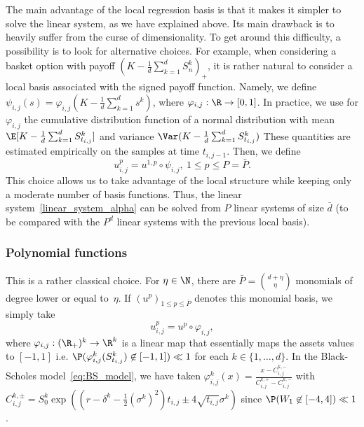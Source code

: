 The main advantage of the local regression basis is that it makes it simpler to solve the linear system, as we have explained above. Its main drawback is to heavily suffer from the curse of dimensionality. To get around this difficulty, a possibility is to look for alternative choices. For example, when considering a basket option with payoff $\left(K- \frac 1d \sum_{k=1}^d S^k_n \right)_+$,
it is rather natural to consider a local basis associated with the signed payoff function. Namely, we define $\psi_{i,j}(s)= \varphi_{i,j}\left( K- \frac 1d \sum_{k=1}^d s^k\right)$, where $\varphi_{i,j}: \R \to [0,1]$. In practice, we use for $\varphi_{i,j}$ the cumulative distribution function of a normal distribution with mean $\E[K- \frac 1d \sum_{k=1}^d S^k_{t_{i,j}}]$ and variance $\Var(K- \frac 1d \sum_{k=1}^d S^k_{t_{i,j}})$
These quantities are estimated empirically on the samples at time $t_{i,j-1}$. Then, we define
\begin{equation}\label{def_upij_localpayoff} u^p_{i,j}=u^{1,p} \circ \psi_{i,j}, \ 1 \le p \le P=\bar{P}.  
\end{equation}
This choice allows us to take advantage of the local structure while keeping only a moderate number of basis functions. Thus, the linear system~\eqref{linear_system_alpha} can be solved from $P$ linear systems of size $\bar{d}$ (to be compared with the $P^d$ linear systems with the previous local basis). 


\subsubsection*{Polynomial functions}

This is a rather classical choice. For $\eta \in \N$, there are $\bar{P}=\binom{d+\eta}{\eta}$ monomials of degree lower or equal to~${\eta}$. If $(u^p)_{1\le p\le \bar{P}}$ denotes this monomial basis, we simply take 
\begin{equation}\label{def_upij_polynomial}
  u^p_{i,j}=u^p\circ \varphi_{i,j},
\end{equation} where $\varphi_{i,j}:(\R_+)^k \to \R^k$ is a linear map that essentially maps the assets values to $[-1,1]$ i.e. $\P(\varphi^k_{i,j}(S^k_{t_{i,j}}) \not \in [-1,1]) \ll 1$ for each $k\in \{1,\dots,d\}$. In the Black-Scholes model~\eqref{eq:BS_model}, we have taken $\varphi^k_{i,j}(x)=\frac{x-C_{i,j}^{k,-}}{C_{i,j}^{k,+}-C_{i,j}^{k,-}}$ with $C_{i,j}^{k,\pm}=S^k_0 \exp\left( \left(r-\delta^k- \frac 12 (\sigma^k)^2\right)t_{i,j} \pm 4 \sqrt{t_{i,j}}\sigma^k\right)$ since $\P(W_1 \not \in [-4,4])\ll 1$.  






